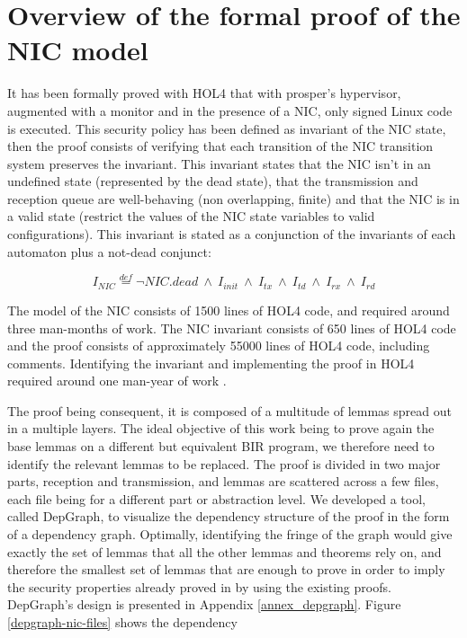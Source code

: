\documentclass{kththesis}
\newcommand{\eqdef}{\stackrel{def}{=}}
\begin{document}
\section{Overview of the formal proof of the NIC model} \label{overview-nic-proof}

It has been formally proved with HOL4 that with \gls{prosper}'s hypervisor, augmented with a monitor and in the presence of a \gls{NIC}, only signed Linux code is executed. This security policy has been defined as invariant of the NIC state, then the proof consists of verifying that each transition of the NIC transition system preserves the invariant. This invariant states that the NIC isn't in an undefined state (represented by the dead state), that the transmission and reception queue are well-behaving (non overlapping, finite) and that the NIC is in a valid state (restrict the values of the NIC state variables to valid configurations). This invariant is stated as a conjunction of the invariants of each automaton plus a not-dead conjunct:

\begin{equation}
    I_{NIC} \eqdef \neg NIC.dead~\land~I_{init}~\land~I_{tx}~\land~I_{td}~\land~I_{rx}~\land~I_{rd}
\end{equation}

The model of the NIC consists of 1500 lines of HOL4 code, and required around three man-months of work. The NIC invariant consists of 650 lines of HOL4 code and the proof consists of approximately 55000 lines of HOL4 code, including comments. Identifying the invariant and implementing the proof in HOL4 required around one man-year of work \cite{haglund_trustworthy_2019}. %

The proof being consequent, it is composed of a multitude of lemmas spread out in a multiple layers. The ideal objective of this work being to prove again the base lemmas on a different but equivalent BIR program, we therefore need to identify the relevant lemmas to be replaced. The proof is divided in two major parts, reception and transmission, and lemmas are scattered across a few files, each file being for a different part or abstraction level. We developed a tool, called DepGraph, to visualize the dependency structure of the proof in the form of a dependency graph. Optimally, identifying the fringe of the graph would give exactly the set of lemmas that all the other lemmas and theorems rely on, and therefore the smallest set of lemmas that are enough to prove in order to imply the security properties already proved in \cite{haglund_trustworthy_2019} by using the existing proofs. DepGraph's design is presented in Appendix \ref{annex_depgraph}. Figure \ref{depgraph-nic-files} shows the dependency 
\end{document}
